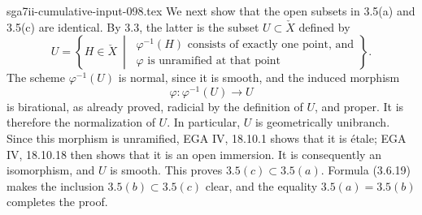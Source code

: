 \begin{filecontents*}{sga7ii-cumulative-input-098.tex}
We next show that the open subsets in 3.5(a) and 3.5(c) are
identical.  By 3.3, the latter is the subset $U\subset\check X$
defined by
\begin{equation}\tag{3.6.19}
U=\left\{H\in\check X\ \middle|\
\begin{array}{l}
\varphi^{-1}(H)\text{ consists of exactly one point, and}\\
\varphi\text{ is unramified at that point}
\end{array}
\right\}.
\end{equation}
The scheme $\varphi^{-1}(U)$ is normal, since it is smooth, and the
induced morphism
\[
\varphi:\varphi^{-1}(U)\longrightarrow U
\]
is birational, as already proved, radicial by the definition of $U$,
and proper.  It is therefore the normalization of $U$.  In
particular, $U$ is geometrically unibranch.  Since this morphism is
unramified, EGA IV, 18.10.1 shows that it is étale; EGA IV, 18.10.18
then shows that it is an open immersion.  It is consequently an
isomorphism, and $U$ is smooth.  This proves
$3.5(c)\subset 3.5(a)$.  Formula (3.6.19) makes the inclusion
$3.5(b)\subset 3.5(c)$ clear, and the equality
$3.5(a)=3.5(b)$ completes the proof.
\end{filecontents*}
